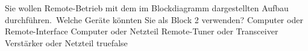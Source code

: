     {Sie wollen Remote-Betrieb mit dem im Blockdiagramm dargestellten Aufbau durchführen. Welche Geräte könnten Sie als Block 2 verwenden?}
    {Computer oder Remote-Interface}
    {Computer oder Netzteil}
    {Remote-Tuner oder Transceiver}
    {Verstärker oder Netzteil}
    {true}{false}